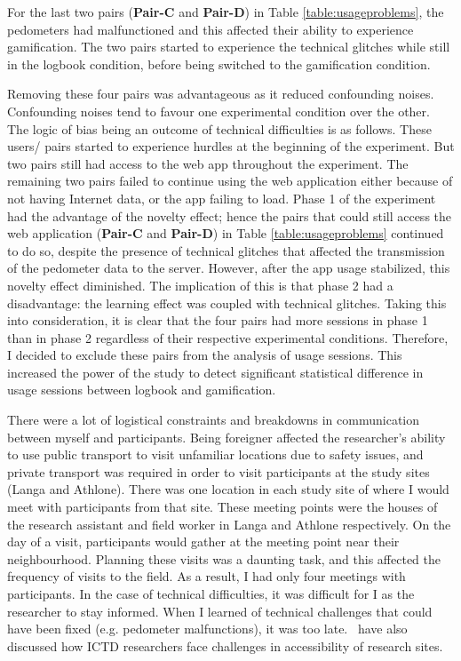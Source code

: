 For the last two pairs (\textbf{Pair-C} and \textbf{Pair-D}) in Table \ref{table:usageproblems}, the pedometers had malfunctioned and this affected their ability to experience gamification. The two pairs started to experience the technical glitches while still in the logbook condition, before being switched to the gamification condition.

Removing these four pairs was advantageous as it reduced confounding noises. Confounding noises  tend to favour one experimental condition over the other. The logic of bias being an outcome of technical difficulties is as follows. These users/ pairs started to experience hurdles at the beginning of the experiment. But two pairs still had access to the web app throughout the experiment. The remaining two pairs failed to continue using the web application either because of not having Internet data, or the app failing to load. Phase 1 of the experiment had the advantage of the novelty effect; hence the pairs that could still access the web application (\textbf{Pair-C} and \textbf{Pair-D}) in Table \ref{table:usageproblems} continued to do so, despite the presence of technical glitches that affected the transmission of the pedometer data to the server. However, after the app usage stabilized, this novelty effect diminished. The implication of this is that phase 2  had a disadvantage: the learning effect was coupled with technical glitches. Taking this into consideration, it is clear that the four pairs had more sessions in phase 1 than in phase 2 regardless of their respective experimental conditions. Therefore, I decided to exclude these pairs from the analysis of usage sessions. This increased the power of the study to detect significant statistical difference in usage sessions between logbook and gamification.

There were a lot of logistical constraints and breakdowns in communication between myself and participants. Being foreigner affected the researcher's ability to use public transport to visit unfamiliar locations due to safety issues, and private transport was required in order to visit participants at the study sites (Langa and Athlone). There was one location in each study site of where I would meet with participants from that site. These meeting points were the houses of the research assistant and field worker in Langa and Athlone respectively. On the day of a visit, participants would gather at the meeting point near their neighbourhood. Planning these visits was a daunting task, and this affected the frequency of visits to the field.  As a result, I had only four meetings with participants. In the case of technical difficulties, it was difficult for I as the researcher to stay informed. When I learned of technical challenges that could have been fixed (e.g. pedometer malfunctions), it was too late.~\cite{anokwa2009stories} have also discussed how ICTD researchers face challenges in accessibility of research sites.  

